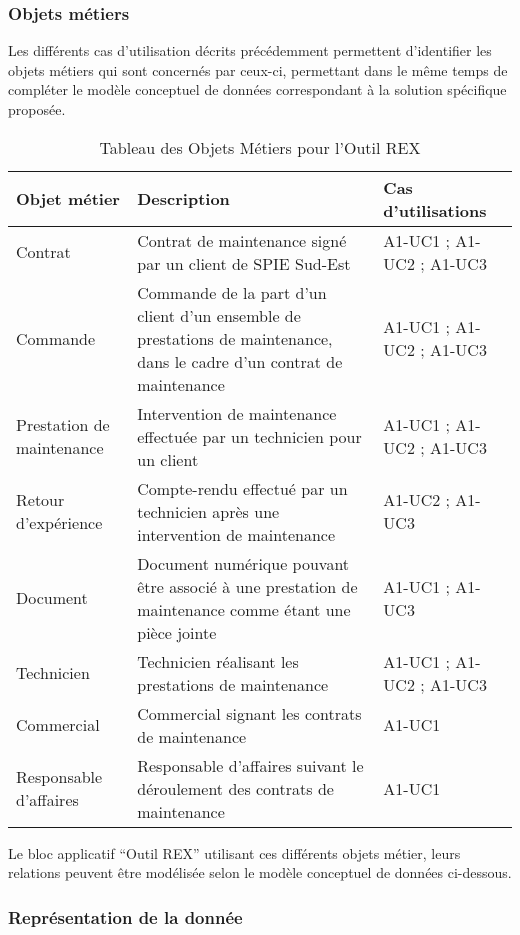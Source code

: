 \subsubsection{Objets métiers}

Les différents cas d’utilisation décrits précédemment permettent d’identifier les objets métiers qui sont concernés par ceux-ci, permettant dans le même temps de compléter le modèle conceptuel de données correspondant à la solution spécifique proposée.

\begin{table}[H]
    \begin{tabular}{p{3cm}|p{10cm}|p{3cm}}
    Objet métier & Description & Cas d'utilisations \\ \hline
    Contrat & Contrat de maintenance signé par un client de SPIE Sud-Est & A1-UC1 ; A1-UC2 ; A1-UC3 \\ \hline
    Commande & Commande de la part d’un client d’un ensemble de prestations de maintenance, dans le cadre d’un contrat de maintenance & A1-UC1 ; A1-UC2 ; A1-UC3 \\ \hline
    Prestation de maintenance & Intervention de maintenance effectuée par un technicien pour un client & A1-UC1 ; A1-UC2 ; A1-UC3 \\ \hline
    Retour d’expérience & Compte-rendu effectué par un technicien après une intervention de maintenance & A1-UC2 ; A1-UC3 \\ \hline
    Document & Document numérique pouvant être associé à une prestation de maintenance comme étant une pièce jointe & A1-UC1 ;
A1-UC3 \\
    Technicien & Technicien réalisant les prestations de maintenance & A1-UC1 ; A1-UC2 ; A1-UC3 \\ \hline
    Commercial & Commercial signant les contrats de maintenance & A1-UC1 \\ \hline
    Responsable d’affaires & Responsable d’affaires suivant le déroulement des contrats de maintenance & A1-UC1 \\
    \end{tabular}
    \caption{Tableau des Objets Métiers pour l'Outil REX}
\end{table}

Le bloc applicatif “Outil REX” utilisant ces différents objets métier, leurs relations peuvent être modélisée selon le modèle conceptuel de données ci-dessous.


\subsubsection{Représentation de la donnée}

